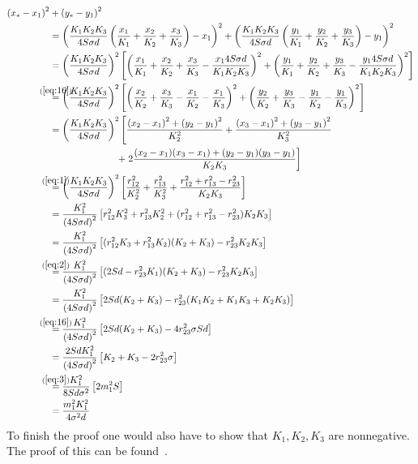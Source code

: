 \begin{align}
  {(x_\ast - x_1)}^2
  &+ {(y_\ast - y_1)}^2 \\
  &= {\left( \frac{K_1 K_2 K_3}{4 S \sigma d} \left( \frac{x_1}{K_1} +
    \frac{x_2}{K_2} + \frac{x_3}{K_3} \right) - x_1 \right)}^2 +
    {\left( \frac{K_1 K_2 K_3}{4 S \sigma d} \left( \frac{y_1}{K_1} +
    \frac{y_2}{K_2} + \frac{y_3}{K_3} \right) - y_1 \right)}^2 \\
  &= {\left( \frac{K_1 K_2 K_3}{4 S \sigma d} \right)}^2 \left[{\left(
    \frac{x_1}{K_1} + \frac{x_2}{K_2} + \frac{x_3}{K_3} -
    \frac{x_1 4 S \sigma d}{K_1 K_2 K_3} \right)}^2 + {\left(
    \frac{y_1}{K_1} + \frac{y_2}{K_2} + \frac{y_3}{K_3} -
    \frac{y_1 4 S \sigma d}{K_1 K_2 K_3} \right)}^2 \right] \\
  &\stackrel{\mathclap{(\ref{eq:16})}}{=}
    {\left( \frac{K_1 K_2 K_3}{4 S \sigma d} \right)}^2
    \left[ {\left( \frac{x_2}{K_2} + \frac{x_3}{K_3} - \frac{x_1}{K_2} -
    \frac{x_1}{K_3} \right)}^2 + {\left( \frac{y_2}{K_2} + \frac{y_3}{K_3} -
    \frac{y_1}{K_2} - \frac{y_1}{K_3} \right)}^2 \right] \\
  &= {\left( \frac{K_1 K_2 K_3}{4 S \sigma d} \right)}^2
    \left[ \frac{{(x_2 - x_1)}^2 + {(y_2 - y_1)}^2}{K_2^2} +
    \frac{{(x_3 - x_1)}^2 + {(y_3 - y_1)}^2}{K_3^2} \right. \\
  &\hspace{7em} \left. + \; 2 \frac{(x_2 - x_1)(x_3 - x_1) +
    (y_2 - y_1)(y_3 - y_1)}{K_2 K_3} \right] \\
  &\stackrel{\mathclap{(\ref{eq:1})}}{=}
    {\left( \frac{K_1 K_2 K_3}{4 S \sigma d} \right)}^2
    \left[ \frac{r_{12}^2}{K_2^2} + \frac{r_{13}^2}{K_3^2} +
    \frac{r_{12}^2 + r_{13}^2 - r_{23}^2}{K_2 K_3} \right] \\
  &= \frac{K_1^2}{{(4 S \sigma d)}^2}
    \left[ r_{12}^2 K_3^2 + r_{13}^2 K_2^2 +
    (r_{12}^2 + r_{13}^2 - r_{23}^2) K_2 K_3 \right] \\
  &= \frac{K_1^2}{{(4 S \sigma d)}^2}
    \left[ (r_{12}^2 K_3 + r_{13}^2 K_2) (K_2 + K_3) -
    r_{23}^2 K_2 K_3 \right] \\
  &\stackrel{\mathclap{(\ref{eq:2})}}{=}
    \frac{K_1^2}{{(4 S \sigma d)}^2}
    \left[ (2 S d - r_{23}^2 K_1) (K_2 + K_3) - r_{23}^2 K_2 K_3 \right] \\
  &= \frac{K_1^2}{{(4 S \sigma d)}^2}
    \left[ 2 S d (K_2 + K_3) - r_{23}^2 (K_1 K_2 + K_1 K_3 + K_2 K_3) \right] \\
  &\stackrel{\mathclap{(\ref{eq:16})}}{=}
    \frac{K_1^2}{{(4 S \sigma d)}^2}
    \left[ 2 S d (K_2 + K_3) - 4 r_{23}^2 \sigma S d \right] \\
  &= \frac{2 S d K_1^2}{{(4 S \sigma d)}^2}
    \left[ K_2 + K_3 - 2 r_{23}^2 \sigma \right] \\
  &\stackrel{\mathclap{(\ref{eq:3})}}{=}
    \frac{K_1^2}{8 S d \sigma^2}
    \left[ 2 m_1^2 S \right] \\
  &= \frac{m_1^2 K_1^2}{4 \sigma^2 d}
\end{align}
%
To finish the proof one would also have to show that $K_1, K_2, K_3$ are
nonnegative. The proof of this can be found~\cite[p.~5-6]{uteshev2014}.

